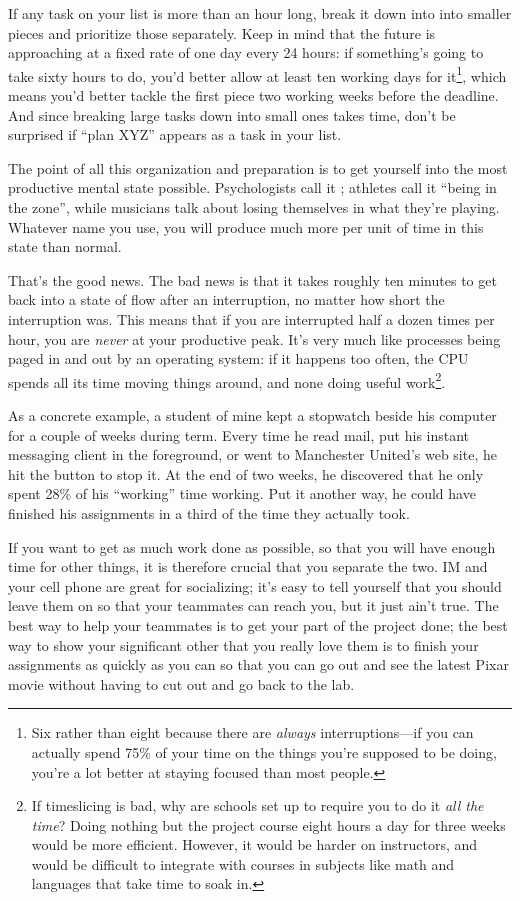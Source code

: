 \documentclass{report}
\begin{document}
If any task on your list is more than an hour long, break it down into
into smaller pieces and prioritize those separately.  Keep in mind
that the future is approaching at a fixed rate of one day every 24
hours: if something's going to take sixty hours to do, you'd better
allow at least ten working days for it\footnote{Six rather than eight
because there are \emph{always} interruptions---if you can actually
spend 75\% of your time on the things you're supposed to be doing,
you're a lot better at staying focused than most people.}, which means
you'd better tackle the first piece two working weeks before the
deadline.  And since breaking large tasks down into small ones takes
time, don't be surprised if ``plan XYZ'' appears as a task in your
list.

The point of all this organization and preparation is to get yourself
into the most productive mental state possible.  Psychologists call it
 \cite{b:csikszentmihalyi-flow}; athletes call it
``being in the zone'', while musicians talk about losing themselves in
what they're playing.  Whatever name you use, you will produce much
more per unit of time in this state than normal.

That's the good news.  The bad news is that it takes roughly ten
minutes to get back into a state of flow after an interruption, no
matter how short the interruption was.  This means that if you are
interrupted half a dozen times per hour, you are \emph{never} at your
productive peak.  It's very much like processes being paged in and out
by an operating system: if it happens too often, the CPU spends all
its time moving things around, and none doing useful work\footnote{ If
timeslicing is bad, why are schools set up to require you to do it
\emph{all the time}?  Doing nothing but the project course eight hours
a day for three weeks would be more efficient.  However, it would be
harder on instructors, and would be difficult to integrate with
courses in subjects like math and languages that take time to soak
in.}.

As a concrete example, a student of mine kept a stopwatch beside his
computer for a couple of weeks during term.  Every time he read mail,
put his instant messaging client in the foreground, or went to
Manchester United's web site, he hit the button to stop it.  At the
end of two weeks, he discovered that he only spent 28\% of his
``working'' time working.  Put it another way, he could have finished
his assignments in a third of the time they actually took.

If you want to get as much work done as possible, so that you will
have enough time for other things, it is therefore crucial that you
separate the two.  IM and your cell phone are great for socializing;
it's easy to tell yourself that you should leave them on so that your
teammates can reach you, but it just ain't true.  The best way to help
your teammates is to get your part of the project done; the best way
to show your significant other that you really love them is to finish
your assignments as quickly as you can so that you can go out and see
the latest Pixar movie without having to cut out and go back to the
lab.
\end{document}
